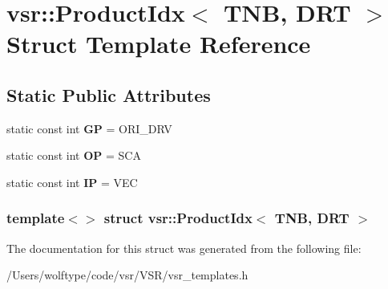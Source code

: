 \hypertarget{structvsr_1_1_product_idx_3_01_t_n_b_00_01_d_r_t_01_4}{\section{vsr\-:\-:Product\-Idx$<$ T\-N\-B, D\-R\-T $>$ Struct Template Reference}
\label{structvsr_1_1_product_idx_3_01_t_n_b_00_01_d_r_t_01_4}
}
\subsection*{Static Public Attributes}
\begin{DoxyCompactItemize}
\item 
\hypertarget{structvsr_1_1_product_idx_3_01_t_n_b_00_01_d_r_t_01_4_aa6d11b915efd9e98fb534ebe8b9bf35a}{static const int {\bfseries G\-P} = O\-R\-I\-\_\-\-D\-R\-V}\label{structvsr_1_1_product_idx_3_01_t_n_b_00_01_d_r_t_01_4_aa6d11b915efd9e98fb534ebe8b9bf35a}

\item 
\hypertarget{structvsr_1_1_product_idx_3_01_t_n_b_00_01_d_r_t_01_4_ac9a2dbbc45da891301d1111fbe078d65}{static const int {\bfseries O\-P} = S\-C\-A}\label{structvsr_1_1_product_idx_3_01_t_n_b_00_01_d_r_t_01_4_ac9a2dbbc45da891301d1111fbe078d65}

\item 
\hypertarget{structvsr_1_1_product_idx_3_01_t_n_b_00_01_d_r_t_01_4_a615aa2285dea6f53fb413ed266eac5c3}{static const int {\bfseries I\-P} = V\-E\-C}\label{structvsr_1_1_product_idx_3_01_t_n_b_00_01_d_r_t_01_4_a615aa2285dea6f53fb413ed266eac5c3}

\end{DoxyCompactItemize}
\subsubsection*{template$<$$>$ struct vsr\-::\-Product\-Idx$<$ T\-N\-B, D\-R\-T $>$}



The documentation for this struct was generated from the following file\-:\begin{DoxyCompactItemize}
\item 
/\-Users/wolftype/code/vsr/\-V\-S\-R/vsr\-\_\-templates.\-h\end{DoxyCompactItemize}
